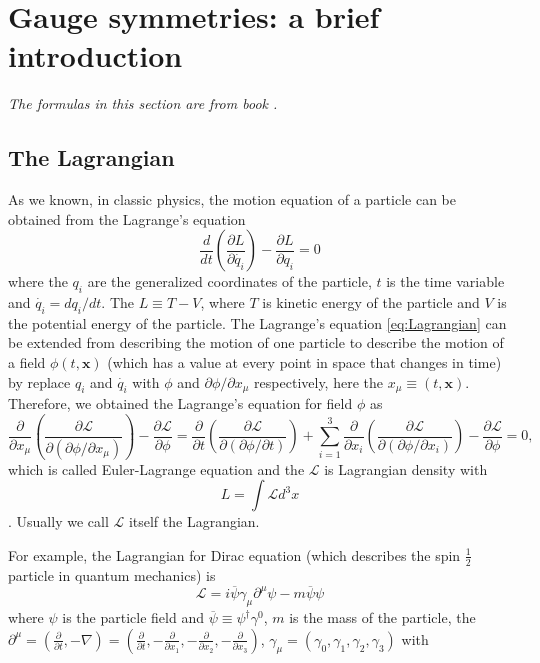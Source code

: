 \section{Gauge symmetries: a brief introduction}\label{sec:Gauge}
\textit{The formulas in this section are from book \cite{Quark_Lepton}.}
\subsection{The Lagrangian}\label{subsec:Lagrangian}

As we known, in classic physics, the motion equation of a particle can be obtained from the Lagrange's equation
\begin{equation}
\frac{d}{dt}(\frac{\partial L}{\partial \dot{q_i}}) - \frac{\partial L}{\partial q_i}=0
\label{eq:Lagrangian}
\end{equation}
where the $q_i$ are the generalized coordinates of the particle, $t$ is the time variable and $\dot{q_i}=dq_i/dt$. The $L\equiv T-V$, where $T$ is kinetic energy of the particle and $V$ is the potential energy of the particle. The Lagrange's equation \ref{eq:Lagrangian} can be extended from describing the motion of one particle to describe the motion of a field $\phi(t,\mathbf{x})$ (which has a value at every point in space that changes in time) by replace $q_i$ and $\dot{q_i}$ with $\phi$ and $\partial\phi/\partial x_\mu$ respectively, here the $x_\mu\equiv(t,\mathbf{x})$. Therefore, we obtained the Lagrange's equation for field $\phi$ as
\begin{equation}
\frac{\partial}{\partial x_\mu}(\frac{\partial \mathcal{L}}{\partial (\partial\phi/\partial x_\mu)}) - \frac{\partial \mathcal{L}}{\partial\phi}
=\frac{\partial}{\partial t}(\frac{\partial \mathcal{L}}{\partial (\partial\phi/\partial t)})+\sum_{i=1}^{3}\frac{\partial}{\partial x_i}(\frac{\partial \mathcal{L}}{\partial (\partial\phi/\partial x_i)}) - \frac{\partial \mathcal{L}}{\partial\phi}=0,
\label{eq:Euler_Lagrangian}
\end{equation}
which is called Euler-Lagrange equation and the $\mathcal{L}$ is Lagrangian density with
$$L=\int \mathcal{L} d^{3}x$$.
Usually we call $\mathcal{L}$ itself the Lagrangian.

For example, the Lagrangian for Dirac equation (which describes the spin $\frac{1}{2}$ particle in quantum mechanics) is
\begin{equation}
\mathcal{L}=i\overline{\psi}\gamma_\mu\partial^{\mu}\psi-m\overline{\psi}\psi
\label{eq:Lagrangian_Dirac}
\end{equation}
where $\psi$ is the particle field and $\overline{\psi}\equiv\psi^{\dag}\gamma^{0}$, $m$ is the mass of the particle, the $\partial^{\mu}=(\frac{\partial}{\partial t}, -\nabla)=(\frac{\partial}{\partial t}, -\frac{\partial}{\partial x_1}, -\frac{\partial}{\partial x_2}, -\frac{\partial}{\partial x_3})$, $\gamma_\mu=(\gamma_0, \gamma_1, \gamma_2, \gamma_3)$ with


